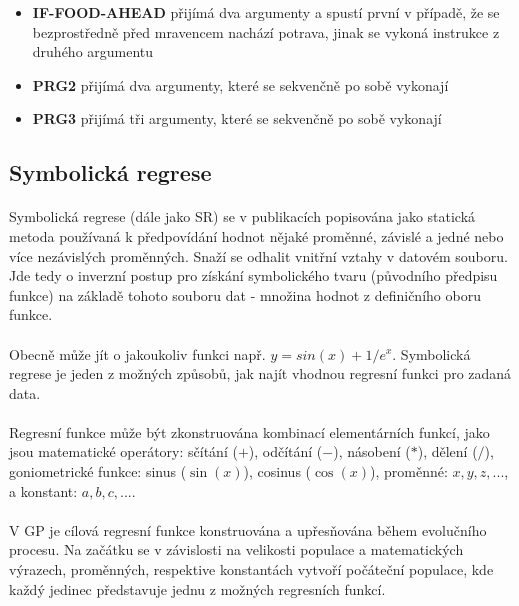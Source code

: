 \documentclass[bc,male,java,dept460]{diploma}		%
\begin{document}
\begin{itemize}
\item \textbf{IF-FOOD-AHEAD} přijímá dva argumenty a spustí první v případě, že se bezprostředně před mravencem nachází potrava, jinak se vykoná instrukce z druhého argumentu
\item \textbf{PRG2} přijímá dva argumenty, které se sekvenčně po sobě vykonají
\item \textbf{PRG3} přijímá tři argumenty, které se sekvenčně po sobě vykonají
\end{itemize}

\subsection{Symbolická regrese}
\paragraph*{}
Symbolická regrese (dále jako SR) se v publikacích popisována jako statická metoda používaná k předpovídání hodnot nějaké proměnné, závislé a jedné nebo více nezávislých proměnných. Snaží se odhalit vnitřní vztahy v datovém souboru. Jde tedy o inverzní postup pro získání symbolického tvaru (původního předpisu funkce) na základě tohoto souboru dat - množina hodnot z definičního oboru funkce. 

\paragraph*{}
Obecně může jít o jakoukoliv funkci např. $y=sin(x)+1/e^x$. Symbolická regrese je jeden z možných způsobů, jak najít vhodnou regresní funkci pro zadaná data.

\paragraph*{}
Regresní funkce může být zkonstruována kombinací elementárních funkcí, jako jsou matematické operátory: sčítání ($+$), odčítání ($-$), násobení ($*$), dělení ($/$), goniometrické funkce: sinus ($\sin(x)$), cosinus ($\cos(x)$), proměnné:  $x, y, z, ...$, a konstant: $a, b, c, ...$. 

\paragraph*{}
V GP je cílová regresní funkce konstruována a upřesňována během evolučního procesu. Na začátku se v závislosti na velikosti populace a matematických výrazech, proměnných, respektive konstantách vytvoří počáteční populace, kde každý jedinec představuje jednu z možných regresních funkcí.
\end{document}
